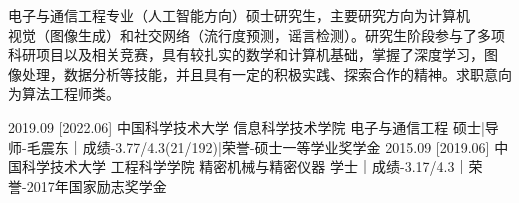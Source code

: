 \documentclass[zh]{resume}
\begin{document}
\makeheader

{\onehalfspacing\hspace{2em}%
电子与通信工程专业（人工智能方向）硕士研究生，主要研究方向为计算机\\视觉（图像生成）和社交网络（流行度预测，谣言检测）。研究生阶段参与了多项\\科研项目以及相关竞赛，具有较扎实的数学和计算机基础，掌握了深度学习，图\\像处理，数据分析等技能，并且具有一定的积极实践、探索合作的精神。求职意向\\为算法工程师类。
\par}

\begin{educations}

  \education%
    {2019.09}%
    [2022.06]%
    {中国科学技术大学}%
    {信息科学技术学院}%
    {电子与通信工程}%
    {硕士|导师-毛震东｜成绩-3.77/4.3(21/192)|荣誉-硕士一等学业奖学金}
  \separator{0.5ex}
  \education%
    {2015.09}%
    [2019.06]%
    {中国科学技术大学}%
    {工程科学学院}%
    {精密机械与精密仪器}%
    {学士｜成绩-3.17/4.3｜荣誉-2017年国家励志奖学金}
\end{educations}

\end{document}
